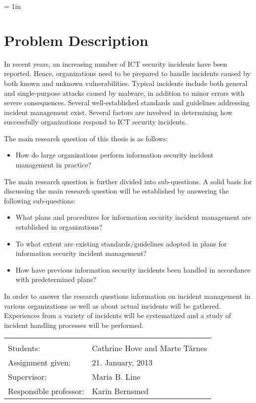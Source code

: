 \footskip = 1in
\chapter*{Problem Description}
\vspace{-1cm}
In recent years, an increasing number of ICT security incidents have been reported. Hence, organizations need to be prepared to handle incidents caused by both known and unknown vulnerabilities. Typical incidents include both general and single-purpose attacks caused by malware, in addition to minor errors with severe consequences. Several well-established standards and guidelines addressing incident management exist. %
Several factors are involved in determining how successfully organizations respond to ICT security incidents. 

The main research question of this thesis is as follows: 
\vspace{-0.1cm}
\begin{itemize}
\item How do large organizations perform information security incident management in practice?
\end{itemize}

The main research question is further divided into sub-questions. A solid basis for discussing the main research question will be established by answering the following sub-questions:
\vspace{-0.1cm}
\begin{itemize}\itemsep-0.2cm
\item What plans and procedures for information security incident management are established in organizations?
\item To what extent are existing standards/guidelines adopted in plans for information security incident management?
\item How have previous information security incidents been handled in accordance with predetermined plans? 
\end{itemize}

In order to answer the research questions information on incident management in various organizations as well as about actual incidents will be gathered. Experiences from a variety of incidents will be systematized and a study of incident handling processes will be performed.
\vspace{0.1cm}

\begin{tabular}{@{}p{4cm}l}
\vspace{0.1cm} & \vspace{0.1cm} \\
Students:		& Cathrine Hove and Marte T\aa rnes \\
Assignment given: & 21. January, 2013 \\
Supervisor:		& Maria B. Line \\
Responsible professor: 	& Karin Bernsmed 
\end{tabular}

